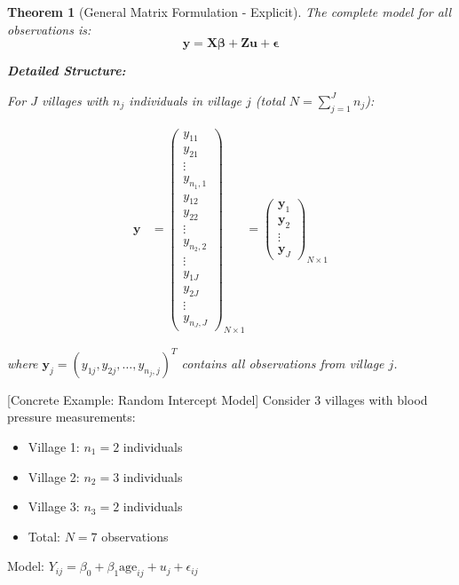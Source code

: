 \documentclass{article}
\newtheorem{theorem}{Theorem}
\begin{document}
\begin{theorem}[General Matrix Formulation - Explicit]
The complete model for all observations is:
\begin{equation}
\mathbf{y} = \mathbf{X}\boldsymbol{\beta} + \mathbf{Z}\mathbf{u} + \boldsymbol{\epsilon}
\end{equation}

\textbf{Detailed Structure:}

For $J$ villages with $n_j$ individuals in village $j$ (total $N = \sum_{j=1}^J n_j$):

\begin{align}
\mathbf{y} &= \begin{pmatrix} 
y_{11} \\
y_{21} \\
\vdots \\
y_{n_1,1} \\
\hline
y_{12} \\
y_{22} \\
\vdots \\
y_{n_2,2} \\
\hline
\vdots \\
\hline
y_{1J} \\
y_{2J} \\
\vdots \\
y_{n_J,J}
\end{pmatrix}_{N \times 1} 
= \begin{pmatrix} 
\mathbf{y}_1 \\ 
\mathbf{y}_2 \\ 
\vdots \\ 
\mathbf{y}_J 
\end{pmatrix}_{N \times 1}
\end{align}

where $\mathbf{y}_j = (y_{1j}, y_{2j}, \ldots, y_{n_j,j})^T$ contains all observations from village $j$.
\end{theorem}

[Concrete Example: Random Intercept Model]
Consider 3 villages with blood pressure measurements:
\begin{itemize}
    \item Village 1: $n_1 = 2$ individuals
    \item Village 2: $n_2 = 3$ individuals  
    \item Village 3: $n_3 = 2$ individuals
    \item Total: $N = 7$ observations
\end{itemize}

Model: $Y_{ij} = \beta_0 + \beta_1 \text{age}_{ij} + u_j + \epsilon_{ij}$
\end{document}
